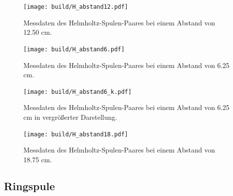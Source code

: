 \begin{figure}
  \centering
  \texttt{[image: build/H\_abstand12.pdf]}
  \caption{Messdaten des Helmholtz-Spulen-Paares bei einem Abstand von 12.50 \si{\centi\m}.}\label{fig:H12}
\end{figure}

\begin{figure}
  \centering
  \texttt{[image: build/H\_abstand6.pdf]}
  \caption{Messdaten des Helmholtz-Spulen-Paares bei einem Abstand von 6.25 \si{\centi\m}.}\label{fig:H6}
\end{figure}

\begin{figure}
  \centering
  \texttt{[image: build/H\_abstand6\_k.pdf]}
  \caption{Messdaten des Helmholtz-Spulen-Paares bei einem Abstand von 6.25 \si{\centi\m} in vergrößerter Darstellung.}\label{fig:H6_1}
\end{figure}


\begin{figure}
  \centering
  \texttt{[image: build/H\_abstand18.pdf]}
  \caption{Messdaten des Helmholtz-Spulen-Paares bei einem Abstand von 18.75 \si{\centi\m}.}\label{fig:H18}
\end{figure}

\newpage
\subsection{Ringspule}


